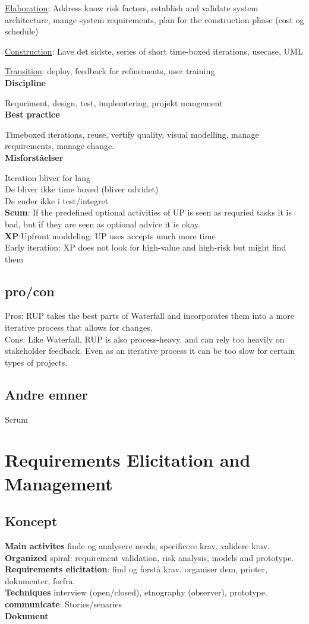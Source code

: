 \documentclass[11pt,a4paper]{article}
\begin{document}
\underline{Elaboration}: Address know risk factors, establish and validate system architecture, mange system requirements, plan for the construction phase (cost og schedule)
 
\underline{Construction}: Lave det sidste, series of short time-boxed iterations, usecase, UML

\underline{Transition}: deploy, feedback for refinements, user training\\
\textbf{Discipline}

Requriment, design, test, implemtering, projekt mangement\\
\textbf{Best practice}

Timeboxed iterations, reuse, vertify quality, visual modelling, manage requirements, manage change.\\
\textbf{Misforståelser}

Iteration bliver for lang\\
De bliver ikke time boxed (bliver udvidet)\\
De ender ikke i test/integret\\
\textbf{Scum}: If the predefined optional activities of UP is seen as requried tasks it is bad, but if they are seen as optional advice it is okay.\\
\textbf{XP}:Upfront moddeling: UP uses accepts much more time\\
Early iteration: XP does not look for high-value and high-risk but might find them
\subsection{pro/con}
Pros: RUP takes the best parts of Waterfall and incorporates them into a more iterative process that allows for changes.\\
Cons: Like Waterfall, RUP is also process-heavy, and can rely too heavily on stakeholder feedback. Even as an iterative process it can be too slow for certain types of projects.
\subsection{Andre emner}
Scrum
\newpage
\section{Requirements Elicitation and Management}
\subsection{Koncept}
\textbf{Main activites} finde og analysere needs, specificere krav, validere krav.\\
\textbf{Organized} spiral: requirement validation, risk analysis, models and prototype.\\
\textbf{Requirements elicitation}: find og forstå krav, organiser dem, prioter, dokumenter, forfra.\\
\textbf{Techniques} interview (open/closed), etnography (observer), prototype.\\
\textbf{communicate}: Stories/senaries\\
\textbf{Dokument}
\end{document}
